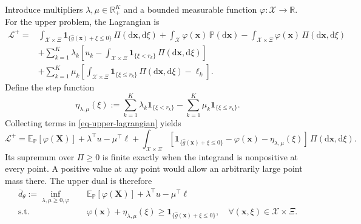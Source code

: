 \documentclass[review,11pt,3p,authoryear,nopreprintline]{elsarticle}
\begin{document}
Introduce multipliers $\lambda,\mu\in\mathbb R_+^K$ and a bounded measurable function $\varphi:\mathcal X\to\mathbb R$. For the upper problem, the Lagrangian is
\begin{equation}
  \begin{aligned}
    \mathcal L^+={}&
    \int_{\mathcal X\times\Xi}\mathbf1_{\{\hat g(\bm x)+\xi\le0\}}\,\Pi(\mathrm d\bm x,\mathrm d\xi)
    +\int_{\mathcal X}\varphi(\bm x)\,\mathbb P(\mathrm d\bm x)
    -\int_{\mathcal X\times\Xi}\varphi(\bm x)\,\Pi(\mathrm d\bm x,\mathrm d\xi)\\
    &+\sum_{k=1}^K\lambda_k
    \left[u_k-\int_{\mathcal X\times\Xi}\mathbf1_{\{\xi<r_k\}}\,\Pi(\mathrm d\bm x,\mathrm d\xi)\right]\\
    &+\sum_{k=1}^K\mu_k
    \left[\int_{\mathcal X\times\Xi}\mathbf1_{\{\xi\le r_k\}}\,\Pi(\mathrm d\bm x,\mathrm d\xi)-\ell_k\right].
  \end{aligned}
  \label{eq-upper-lagrangian}
\end{equation}
Define the step function
\begin{equation}
  \eta_{\lambda,\mu}(\xi):=
  \sum_{k=1}^K\lambda_k\mathbf1_{\{\xi<r_k\}}
  -\sum_{k=1}^K\mu_k\mathbf1_{\{\xi\le r_k\}}.
  \label{eq-dual-step-function}
\end{equation}
Collecting terms in \eqref{eq-upper-lagrangian} yields
\[
  \mathcal L^+
  =
  \mathbb E_{\mathbb P}[\varphi(\bm X)]
  +\lambda^\top u-\mu^\top\ell
  +\int_{\mathcal X\times\Xi}
  \left[\mathbf1_{\{\hat g(\bm x)+\xi\le0\}}-\varphi(\bm x)
  -\eta_{\lambda,\mu}(\xi)\right]\,\Pi(\mathrm d\bm x,\mathrm d\xi).
\]
Its supremum over $\Pi\ge0$ is finite exactly when the integrand is nonpositive at every point. A positive value at any point would allow an arbitrarily large point mass there. The upper dual is therefore
\begin{equation}
  \begin{aligned}
    \overline d_\theta:=\inf_{\lambda,\mu\ge0,\varphi}\quad&
    \mathbb E_{\mathbb P}[\varphi(\bm X)]
    +\lambda^\top u-\mu^\top\ell\\
    \text{s.t.}\quad&
    \varphi(\bm x)+\eta_{\lambda,\mu}(\xi)
    \ge\mathbf1_{\{\hat g(\bm x)+\xi\le0\}},
    \quad\forall(\bm x,\xi)\in\mathcal X\times\Xi.
  \end{aligned}
  \label{eq-upper-measure-dual}
\end{equation}
\end{document}

